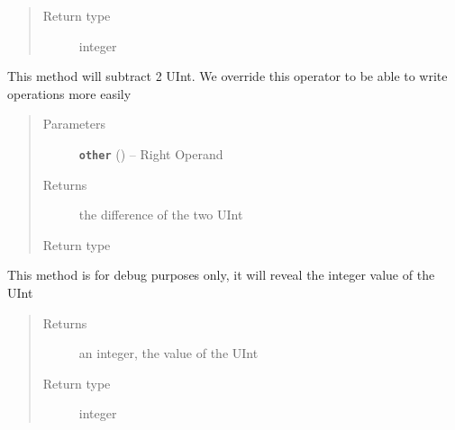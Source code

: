 \documentclass[letterpaper,10pt,english]{sphinxmanual}
\begin{document}
\begin{fulllineitems}
\begin{fulllineitems}
\begin{quote}
\begin{description}
\item[{Return type}] \leavevmode
integer

\end{description}\end{quote}

\end{fulllineitems}


\begin{fulllineitems}
\label{datatypes.integers:datatypes.integers.UInt.UInt.__sub__}
This method will subtract 2 UInt.
We override this operator to be able to write operations more easily
\begin{quote}\begin{description}
\item[{Parameters}] \leavevmode
\textbf{\texttt{other}} ({\hyperref[datatypes.integers:module\string-datatypes.integers.UInt]{}}) -- Right Operand

\item[{Returns}] \leavevmode
the difference of the two UInt

\item[{Return type}] \leavevmode
{\hyperref[datatypes.integers:module\string-datatypes.integers.UInt]{}}

\end{description}\end{quote}

\end{fulllineitems}


\begin{fulllineitems}
\label{datatypes.integers:datatypes.integers.UInt.UInt.debug_showValue}
This method is for debug purposes only, it will reveal the integer value of the UInt
\begin{quote}\begin{description}
\item[{Returns}] \leavevmode
an integer, the value of the UInt

\item[{Return type}] \leavevmode
integer

\end{description}\end{quote}

\end{fulllineitems}


\end{fulllineitems}
\end{document}
